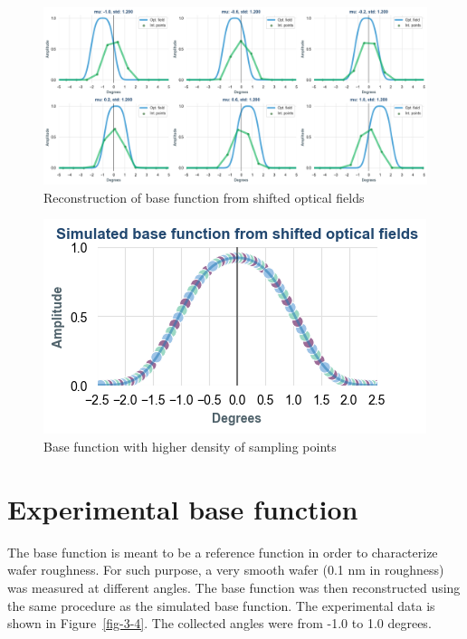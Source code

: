 \documentclass[
  letterpaper,
  DIV=11,
  numbers=noendperiod,
  oneside]{scrreprt}
\begin{document}
\begin{figure}

{\centering \includegraphics{notebooks/b_base_function_files/figure-pdf/fig-3-2-output-1.png}

}

\caption{\label{fig-3-2}Reconstruction of base function from shifted
optical fields}

\end{figure}

\begin{figure}

{\centering \includegraphics{notebooks/b_base_function_files/figure-pdf/fig-3-3-output-1.png}

}

\caption{\label{fig-3-3}Base function with higher density of sampling
points}

\end{figure}

\hypertarget{test}{%
\section{Experimental base function}\label{test}}

The base function is meant to be a reference function in order to
characterize wafer roughness. For such purpose, a very smooth wafer (0.1
nm in roughness) was measured at different angles. The base function was
then reconstructed using the same procedure as the simulated base
function. The experimental data is shown in Figure~\ref{fig-3-4}. The
collected angles were from -1.0 to 1.0 degrees.
\end{document}
